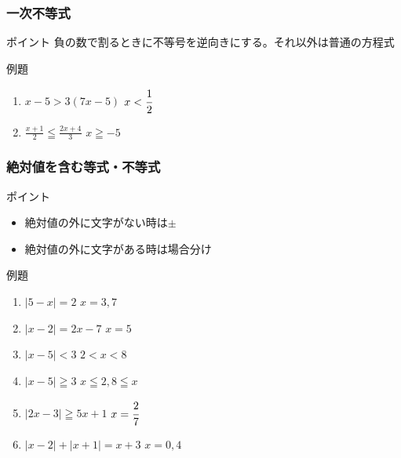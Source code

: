 \documentclass[10pt,dvipdfmx]{jsarticle}
\newcommand{\answer}[2]{{\color{orange}#2}}
\newcommand{\answer}[2]{\vspace{#1mm}}
\begin{document}
\subsubsection*{一次不等式}
\begin{itembox}[l]{ポイント}
  \answer{8}{負の数で割るときに不等号を逆向きにする。それ以外は普通の方程式}

\end{itembox}
\begin{itembox}[l]{例題}
  \begin{large}
    \begin{enumerate}
      \item $x-5>3(7x-5)$ \answer{0}{$x<\cfrac{1}{2}$}
      \item $\frac{x+1}{2}\leqq\frac{2x+4}{3}$ \answer{0}{$x\geqq-5$}
    \end{enumerate}
  \end{large}
\end{itembox}

\subsubsection*{絶対値を含む等式・不等式}
\begin{itembox}[l]{ポイント}
  \begin{Large}
    \begin{itemize}
      \item \answer{0}{絶対値の外に文字がない時は$\pm$}
      \item \answer{0}{絶対値の外に文字がある時は場合分け}
    \end{itemize}
  \end{Large}
\end{itembox}

\begin{itembox}[l]{例題}
  \begin{large}
    \begin{enumerate}
      \item $|5-x|=2$  \answer{0}{$x=3, 7$}
      \item $|x-2|=2x-7$  \answer{0}{$x=5$}
      \item $|x-5|<3$  \answer{0}{$2<x<8$}
      \item $|x-5|\geqq3$  \answer{0}{$x\leqq2, 8\leqq x$}
      \item $|2x-3|\geqq5x+1$  \answer{0}{$x=\cfrac{2}{7}$}
      \item $|x-2|+|x+1|=x+3$  \answer{0}{$x=0, 4$}
    \end{enumerate}
  \end{large}
\end{itembox}
\end{document}
